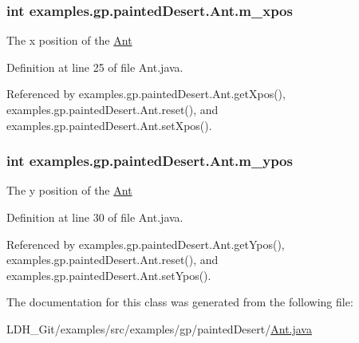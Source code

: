 \hypertarget{classexamples_1_1gp_1_1painted_desert_1_1_ant_a84346d8657288f8b63c1d45e1490445c}{
\subsubsection[{m\-\_\-xpos}]{\setlength{\rightskip}{0pt plus 5cm}int examples.\-gp.\-painted\-Desert.\-Ant.\-m\-\_\-xpos\hspace{0.3cm}{\ttfamily [private]}}}\label{classexamples_1_1gp_1_1painted_desert_1_1_ant_a84346d8657288f8b63c1d45e1490445c}
The x position of the \hyperlink{classexamples_1_1gp_1_1painted_desert_1_1_ant}{Ant} 

Definition at line 25 of file Ant.\-java.



Referenced by examples.\-gp.\-painted\-Desert.\-Ant.\-get\-Xpos(), examples.\-gp.\-painted\-Desert.\-Ant.\-reset(), and examples.\-gp.\-painted\-Desert.\-Ant.\-set\-Xpos().

\hypertarget{classexamples_1_1gp_1_1painted_desert_1_1_ant_a2f61949bf3f5ddb83f6b753aeed37da8}{
\subsubsection[{m\-\_\-ypos}]{\setlength{\rightskip}{0pt plus 5cm}int examples.\-gp.\-painted\-Desert.\-Ant.\-m\-\_\-ypos\hspace{0.3cm}{\ttfamily [private]}}}\label{classexamples_1_1gp_1_1painted_desert_1_1_ant_a2f61949bf3f5ddb83f6b753aeed37da8}
The y position of the \hyperlink{classexamples_1_1gp_1_1painted_desert_1_1_ant}{Ant} 

Definition at line 30 of file Ant.\-java.



Referenced by examples.\-gp.\-painted\-Desert.\-Ant.\-get\-Ypos(), examples.\-gp.\-painted\-Desert.\-Ant.\-reset(), and examples.\-gp.\-painted\-Desert.\-Ant.\-set\-Ypos().



The documentation for this class was generated from the following file\-:\begin{DoxyCompactItemize}
\item 
L\-D\-H\-\_\-\-Git/examples/src/examples/gp/painted\-Desert/\hyperlink{_ant_8java}{Ant.\-java}\end{DoxyCompactItemize}
